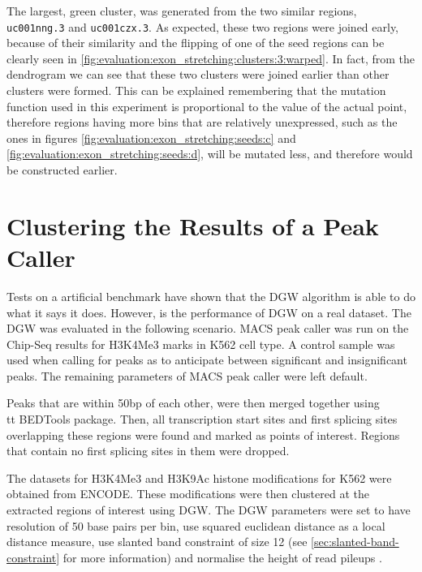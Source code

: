 \documentclass[parskip]{cs4rep}
\newcommand{\gene}[1]{{\tt #1}}
\newcommand{\histonemodification}[1]{#1}
\newcommand{\celltype}[1]{#1}
\begin{document}
The largest, green cluster, was generated from the two similar regions, \gene{uc001nng.3} and \gene{uc001czx.3}. As expected, these two regions were joined early, because of their similarity and the flipping of one of the seed regions can be clearly seen in \autoref{fig:evaluation:exon_stretching:clusters:3:warped}. In fact, from the dendrogram we can see that these two clusters were joined earlier than other clusters were formed. This can be explained remembering that the mutation function used in this experiment is proportional to the value of the actual point, therefore regions having more bins that are relatively unexpressed, such as the ones in figures \ref{fig:evaluation:exon_stretching:seeds:c} and \ref{fig:evaluation:exon_stretching:seeds:d},
will be mutated less, and therefore would be constructed earlier.


\section{Clustering the Results of a Peak Caller}
\label{sec:macs-experiment}
Tests on a artificial benchmark have shown that the DGW algorithm is able to do what it says it does.
However, is the performance of DGW on a real dataset. The DGW was evaluated in the following scenario. MACS peak caller \cite{Zhang:2008wp} was run on the Chip-Seq results for \histonemodification{H3K4Me3} marks in \celltype{K562} cell type. A control sample was used when calling for peaks as to anticipate between significant and insignificant peaks. The remaining parameters of MACS peak caller were left default.

Peaks that are within 50bp of each other, were then merged together using {\\tt BEDTools} package\cite{Quinlan:2010ur}. Then, all transcription start sites and first splicing sites overlapping these regions were found and marked as points of interest. Regions that contain no first splicing sites in them were dropped.

The datasets for \histonemodification{H3K4Me3} and \histonemodification{H3K9Ac} histone modifications for \celltype{K562} were obtained from ENCODE. These modifications were then clustered at the extracted regions of interest using DGW.
The DGW parameters were set to have resolution of 50 base pairs per bin, use squared euclidean distance as a local distance measure, use slanted band constraint of size 12 (see \autoref{sec:slanted-band-constraint} for more information) and normalise the height of read pileups .
\end{document}
